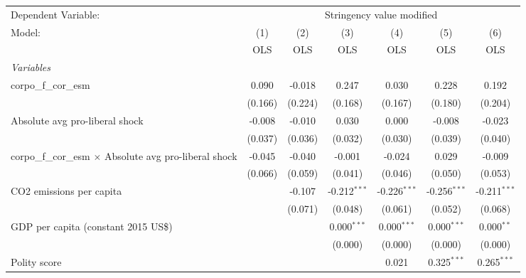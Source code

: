 
\begingroup
\centering
\begin{tabular}{lcccccc}
   \toprule
   Dependent Variable: & \multicolumn{6}{c}{Stringency value modified}\\
   Model:                                                         & (1)     & (2)     & (3)            & (4)            & (5)            & (6)\\  
                                                                  &  OLS    & OLS     & OLS            & OLS            & OLS            & OLS\\  
   \midrule
   \emph{Variables}\\
   corpo\_f\_cor\_esm                                             & 0.090   & -0.018  & 0.247          & 0.030          & 0.228          & 0.192\\   
                                                                  & (0.166) & (0.224) & (0.168)        & (0.167)        & (0.180)        & (0.204)\\   
   Absolute avg pro-liberal shock                                 & -0.008  & -0.010  & 0.030          & 0.000          & -0.008         & -0.023\\   
                                                                  & (0.037) & (0.036) & (0.032)        & (0.030)        & (0.039)        & (0.040)\\   
   corpo\_f\_cor\_esm $\times$ Absolute avg pro-liberal shock     & -0.045  & -0.040  & -0.001         & -0.024         & 0.029          & -0.009\\   
                                                                  & (0.066) & (0.059) & (0.041)        & (0.046)        & (0.050)        & (0.053)\\   
   CO2 emissions per capita                                       &         & -0.107  & -0.212$^{***}$ & -0.226$^{***}$ & -0.256$^{***}$ & -0.211$^{***}$\\   
                                                                  &         & (0.071) & (0.048)        & (0.061)        & (0.052)        & (0.068)\\   
   GDP per capita (constant 2015 US\$)                            &         &         & 0.000$^{***}$  & 0.000$^{***}$  & 0.000$^{***}$  & 0.000$^{**}$\\   
                                                                  &         &         & (0.000)        & (0.000)        & (0.000)        & (0.000)\\   
   Polity score                                                   &         &         &                & 0.021          & 0.325$^{***}$  & 0.265$^{***}$\\   

\end{tabular}
